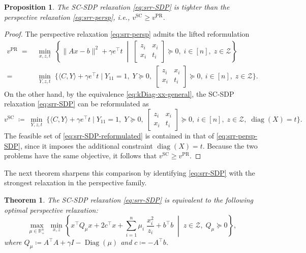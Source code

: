 \documentclass[11pt]{article}
\DeclareMathOperator{\diag}{diag}
\DeclareMathOperator{\Diag}{Diag}
\def\Z{\mathcal{Z}}
\def\R{\mathbb{R}}
\theoremstyle{plain}
\newtheorem{proposition}{Proposition}
\newtheorem{theorem}{Theorem}
\begin{document}
\begin{proposition}\label{thm:SDP-perspective}
The SC-SDP relaxation \eqref{eq:srr-SDP} is tighter than the perspective relaxation \eqref{eq:srr-persp}, i.e., $v^{\mathrm{SC}} \ge v^{\mathrm{PR}}$.
\end{proposition}

\begin{proof}\;
The perspective relaxation \eqref{eq:srr-persp} admits the lifted reformulation
\begin{align}
    v^{\mathrm{PR}}
\;=\;&\min_{x,z,t}\;
 \left\{
    \|Ax-b\|^2+\gamma e^\top t
    \;\middle|\;  
    \begin{bmatrix}
z_i & x_i\\
x_i & t_i
\end{bmatrix}\succeq 0,\; i\in [n],\;
    z\in \mathcal{Z}
\right\}\label{eq:srr-persp-SOCP}\\
=&\min_{Y,z,t}\;
\Big\{
\langle C,Y\rangle + \gamma e^\top t
\;\Big|\;
Y_{11}=1,\;
Y \succeq 0,\;
\begin{bmatrix}
z_i & x_i\\
x_i & t_i
\end{bmatrix}\succeq 0,\ i\in [n],\;
z\in \mathcal{Z}
\Big\}.\label{eq:srr-persp-SDP}
\end{align}
On the other hand, by the equivalence \eqref{eq:kDiag-xx-general}, 
the SC-SDP relaxation \eqref{eq:srr-SDP} can be reformulated as
\begin{equation}\label{eq:srr-SDP-reformulated}
v^{\mathrm{SC}}\;\coloneqq\;\min_{Y,z,t}\;
\Big\{
\langle C,Y\rangle + \gamma e^\top t
\;\Big|\;
Y_{11}=1,\;
Y\succeq 0,\;
\begin{bmatrix}
z_i & x_i\\
x_i & t_i
\end{bmatrix}\succeq 0,\ i\in [n],\;
z\in \mathcal{Z},\; \diag(X)=t
\Big\}.
\end{equation}
The feasible set of \eqref{eq:srr-SDP-reformulated} is contained in that of \eqref{eq:srr-persp-SDP}, since it imposes the additional constraint $\diag(X)=t$. Because the two problems have the same objective, it follows that $v^{\mathrm{SC}} \ge v^{\mathrm{PR}}$.

\end{proof}




The next theorem sharpens this comparison by identifying \eqref{eq:srr-SDP} with the strongest relaxation in the perspective family.

\begin{theorem}\label{thm:srr-opt-persp}
The SC-SDP relaxation \eqref{eq:srr-SDP} is equivalent to the following optimal perspective relaxation:
\begin{equation}\label{eq:srr-opt-persp}
\max_{\mu\in\R^n_+}\;\min_{x,z}
\left\{
x^\top Q_\mu x + 2c^\top x+\sum_{i=1}^n \mu_i\;\frac{x_i^2}{z_i}
+b^\top b
\;\middle|\;
z\in\Z,\;
 Q_\mu \succeq 0
\right\},
\end{equation}
where $Q_\mu\coloneqq A^\top A+\gamma I-\Diag(\mu)$ and $c\coloneqq -A^\top b$.
\end{theorem}
\end{document}
